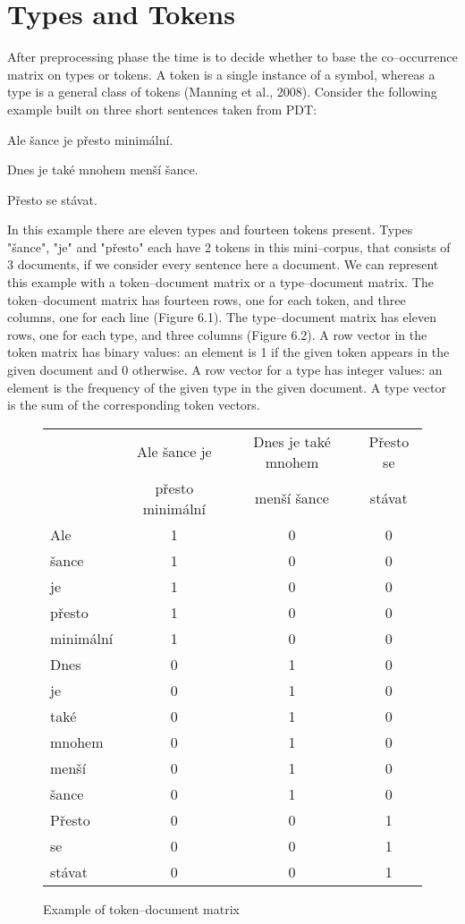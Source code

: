 \section{Types and Tokens}
After preprocessing phase the time is to decide whether to base the co--occurrence matrix on types or tokens. A token is a single instance of a symbol, whereas a type is a general class of tokens (Manning et al., 2008)\cite{manning-etal:08}. Consider the following example built on three short sentences taken from  PDT:
\begin{examples}
\item Ale \v{s}ance je p\v{r}esto minim\'aln\'i.
\item Dnes je tak\'e mnohem men\v{s}\'i \v{s}ance.
\item P\v{r}esto se st\'avat.
\end{examples}
In this example there are eleven types and fourteen tokens present. Types "\v{s}ance", "je" and "p\v{r}esto" each have 2 tokens in this mini--corpus, that consists of 3 documents, if we consider every sentence here a document. We can represent this example with a token--document matrix or a type--document matrix. The token--document matrix has fourteen rows, one for each token, and three columns, one for each line (Figure 6.1). The type--document matrix has eleven rows, one for each type, and three columns (Figure 6.2). A row vector in the token matrix has binary values: an element is 1 if the given token appears in
the given document and 0 otherwise. A row vector for a type has integer values: an element is the frequency of the given type in the given document. A type vector is the sum of the corresponding token vectors.


\begin{figure}[h!]
\begin{center}
	\begin{tabular}{ l | c c c }
   	&  Ale \v{s}ance je  & Dnes je tak\'e mnohem & P\v{r}esto se \\
	& p\v{r}esto minim\'aln\'i & men\v{s}\'i \v{s}ance & st\'avat \\
  	\hline                       
  	Ale & 1 & 0 & 0 \\
  	\v{s}ance & 1 & 0 & 0 \\
  	je & 1 & 0 & 0 \\
  	p\v{r}esto & 1 & 0 & 0 \\
  	minim\'aln\'i & 1 & 0 & 0 \\
	Dnes & 0 & 1 & 0 \\
	je  & 0 & 1 & 0 \\
	tak\'e & 0 & 1 & 0 \\
	mnohem & 0 & 1 & 0 \\
	men\v{s}\'i & 0 & 1 & 0 \\
	\v{s}ance & 0 & 1 & 0 \\
	P\v{r}esto  & 0 & 0 & 1 \\
	se  & 0 & 0 & 1 \\
	st\'avat & 0 & 0 & 1 \\
	\end{tabular}
\end{center}
\caption{Example of token--document matrix}
\end{figure}

